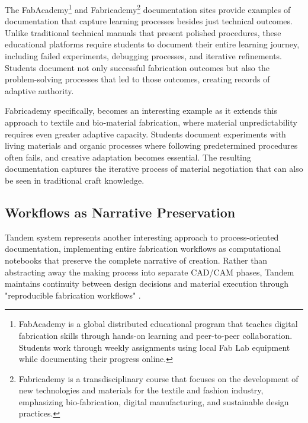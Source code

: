The FabAcademy\footnote{FabAcademy is a global distributed educational program that teaches digital fabrication skills through hands-on learning and peer-to-peer collaboration. Students work through weekly assignments using local Fab Lab equipment while documenting their progress online.} and Fabricademy\footnote{Fabricademy is a transdisciplinary course that focuses on the development of new technologies and materials for the textile and fashion industry, emphasizing bio-fabrication, digital manufacturing, and sustainable design practices.} documentation sites provide examples of documentation that capture learning processes besides just technical outcomes. Unlike traditional technical manuals that present polished procedures, these educational platforms require students to document their entire learning journey, including failed experiments, debugging processes, and iterative refinements. Students document not only successful fabrication outcomes but also the problem-solving processes that led to those outcomes, creating records of adaptive authority.

\vspace{0.5cm}

Fabricademy specifically, becomes an interesting example as it extends this approach to textile and bio-material fabrication, where material unpredictability requires even greater adaptive capacity. Students document experiments with living materials and organic processes where following predetermined procedures often fails, and creative adaptation becomes essential. The resulting documentation captures the iterative process of material negotiation that can also be seen in traditional craft knowledge.

\subsection{Workflows as Narrative Preservation}

Tandem system \citep{tran_oleary_tandem_2024} represents another interesting approach to process-oriented documentation, implementing entire fabrication workflows as computational notebooks that preserve the complete narrative of creation. Rather than abstracting away the making process into separate CAD/CAM phases, Tandem maintains continuity between design decisions and material execution through "reproducible fabrication workflows" \citep{tran_oleary_tandem_2024}.

\vspace{0.5cm}

